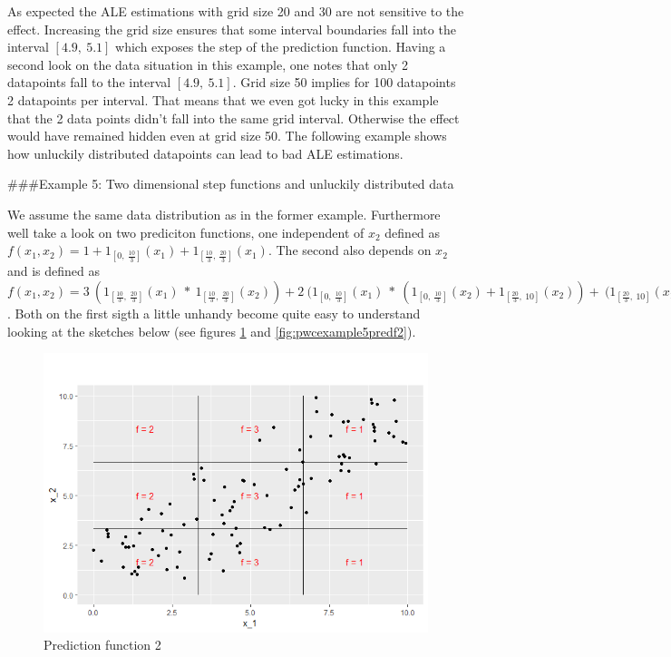 \documentclass[
]{krantz}
\begin{document}
As expected the ALE estimations with grid size 20 and 30 are not sensitive to the effect. Increasing the grid size ensures that some interval boundaries fall into the interval \([4.9, ~5.1]\) which exposes the step of the prediction function.
Having a second look on the data situation in this example, one notes that only 2 datapoints fall to the interval \([4.9, ~5.1]\). Grid size 50 implies for 100 datapoints 2 datapoints per interval. That means that we even got lucky in this example that the 2 data points didn't fall into the same grid interval. Otherwise the effect would have remained hidden even at grid size 50. The following example shows how unluckily distributed datapoints can lead to bad ALE estimations.

\#\#\#Example 5: Two dimensional step functions and unluckily distributed data

We assume the same data distribution as in the former example. Furthermore well take a look on two prediciton functions, one independent of \(x_2\) defined as \(f(x_1, x_2) = 1 + 1_{[0,~\frac{10}{3}]}(x_1)+ 1_{[\frac{10}{3},~\frac{20}{3}]}(x_1)\). The second also depends on \(x_2\) and is defined as
\(f(x_1, x_2) = 3~(1_{[\frac{10}{3},~\frac{20}{3}]}(x_1)~*~1_{[\frac{10}{3},~\frac{20}{3}]}(x_2)) + 2~(1_{[0,~\frac{10}{3}]}(x_1)~*~(1_{[0,~\frac{10}{3}]}(x_2)+1_{[\frac{20}{3}, ~10]}(x_2)) + ~(1_{[\frac{20}{3},~10]}(x_1)~*~(1_{[0,~\frac{10}{3}]}(x_2)+1_{[\frac{20}{3}, ~10]}(x_2))\) .
Both on the first sigth a little unhandy become quite easy to understand looking at the sketches below (see figures \ref{fig:pwcexample5predf1} and \ref{fig:pwcexample5predf2}).

\begin{figure}
\includegraphics[width=1\linewidth]{images/ALE_2_pwc_example5_predf_1_} \caption{Prediction function 2}\label{fig:pwcexample5predf1}
\end{figure}
\end{document}
